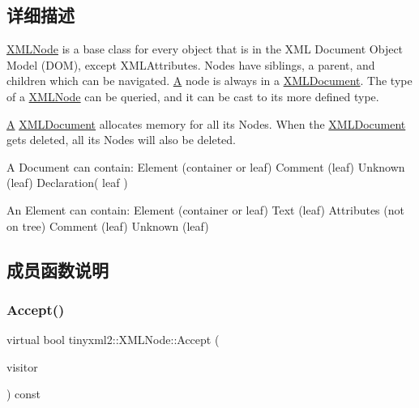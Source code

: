 \subsection{详细描述}
\hyperlink{classtinyxml2_1_1_x_m_l_node}{X\+M\+L\+Node} is a base class for every object that is in the X\+ML Document Object Model (D\+OM), except X\+M\+L\+Attributes. Nodes have siblings, a parent, and children which can be navigated. \hyperlink{struct_a}{A} node is always in a \hyperlink{classtinyxml2_1_1_x_m_l_document}{X\+M\+L\+Document}. The type of a \hyperlink{classtinyxml2_1_1_x_m_l_node}{X\+M\+L\+Node} can be queried, and it can be cast to its more defined type.

\hyperlink{struct_a}{A} \hyperlink{classtinyxml2_1_1_x_m_l_document}{X\+M\+L\+Document} allocates memory for all its Nodes. When the \hyperlink{classtinyxml2_1_1_x_m_l_document}{X\+M\+L\+Document} gets deleted, all its Nodes will also be deleted.

\begin{DoxyVerb}A Document can contain: Element (container or leaf)
                        Comment (leaf)
                        Unknown (leaf)
                        Declaration( leaf )

An Element can contain: Element (container or leaf)
                        Text    (leaf)
                        Attributes (not on tree)
                        Comment (leaf)
                        Unknown (leaf)\end{DoxyVerb}
 

\subsection{成员函数说明}
\mbox{\label{classtinyxml2_1_1_x_m_l_node_a81e66df0a44c67a7af17f3b77a152785}} 
\subsubsection{\texorpdfstring{Accept()}{Accept()}}
{\footnotesize\ttfamily virtual bool tinyxml2\+::\+X\+M\+L\+Node\+::\+Accept (\begin{DoxyParamCaption}\item[{\hyperlink{classtinyxml2_1_1_x_m_l_visitor}{X\+M\+L\+Visitor} $\ast$}]{visitor }\end{DoxyParamCaption}) const\hspace{0.3cm}{\ttfamily [pure virtual]}}

